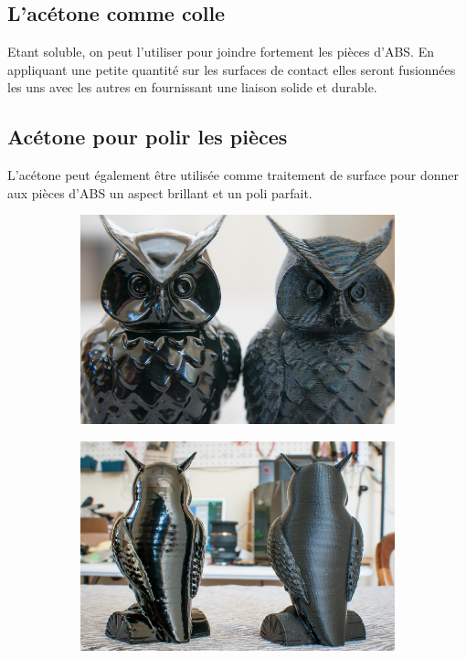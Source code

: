 \documentclass[11pt,a4paper]{article}
\begin{document}
	\subsection{L'acétone comme colle}Etant soluble, on peut l’utiliser pour joindre fortement les pièces d'ABS. En appliquant une petite quantité sur les surfaces de contact elles seront fusionnées les uns avec les autres en fournissant une liaison solide et durable.
	\subsection{Acétone pour polir les pièces}L'acétone peut également être utilisée comme traitement de surface pour donner aux pièces d'ABS un aspect brillant et un poli parfait.
\begin{figure}[H]
    \centering
    \begin{subfigure}[b]{0.4\textwidth}
        \includegraphics[width=\textwidth,cfbox=azul_marcos 4pt 0pt]{FOTOS/VAPORACETONA1}
    \end{subfigure}
    \qquad %
    \begin{subfigure}[b]{0.4\textwidth}
        \includegraphics[width=\textwidth,cfbox=azul_marcos 4pt 0pt]{FOTOS/VAPORACETONA2}
    \end{subfigure}   
\end{figure}
\end{document}
